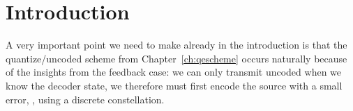 \chapter{Introduction}

A very important point we need to make already in the introduction is that the
quantize\slash uncoded scheme from Chapter~\ref{ch:qescheme} occurs naturally
because of the insights from the feedback case: we can only transmit uncoded
when we know the decoder state, we therefore must first encode the source with a
small error, \ie, using a discrete constellation. 
